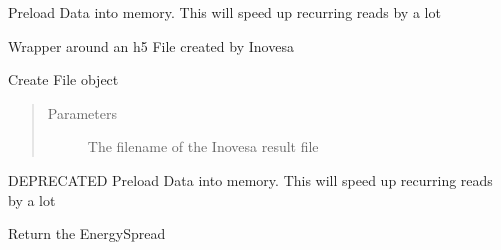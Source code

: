 \documentclass[letterpaper,10pt,openany,oneside,english]{sphinxmanual}
\begin{document}
\begin{fulllineitems}
\begin{fulllineitems}
\end{fulllineitems}


\begin{fulllineitems}
\label{\detokenize{file:file.File.preload_full}}
Preload Data into memory. This will speed up recurring reads by a lot

\end{fulllineitems}


\end{fulllineitems}


\begin{fulllineitems}
\label{\detokenize{file:file.File_dep}}
Wrapper around an h5 File created by Inovesa

\begin{fulllineitems}
\label{\detokenize{file:file.File_dep.__init__}}
Create File object
\begin{quote}\begin{description}
\item[{Parameters}] \leavevmode
{} \textendash{} The filename of the Inovesa result file

\end{description}\end{quote}

\end{fulllineitems}


\begin{fulllineitems}
\label{\detokenize{file:file.File_dep.preload_full}}
DEPRECATED  
Preload Data into memory. This will speed up recurring reads by a lot

\end{fulllineitems}


\begin{fulllineitems}
\label{\detokenize{file:file.File_dep.energy_spread}}
Return the EnergySpread


\end{fulllineitems}
\end{fulllineitems}
\end{document}
